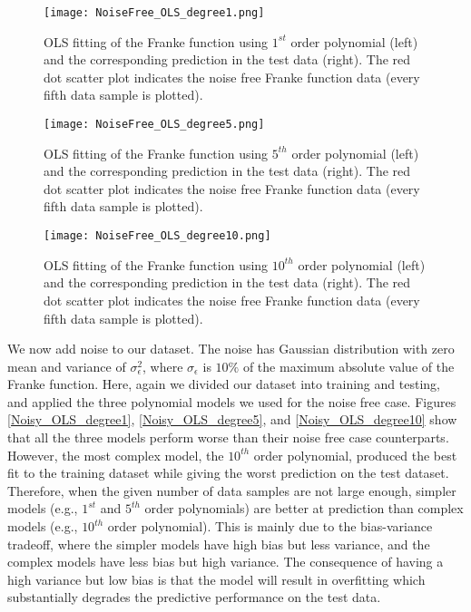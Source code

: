 \documentclass[a4paper]{article}
\begin{document}
\begin{figure}
  \centering
  \texttt{[image: NoiseFree\_OLS\_degree1.png]}
  \caption{OLS fitting of the Franke function using $1^{st}$ order polynomial (left) and the corresponding prediction in the test data (right). The red dot scatter plot indicates the noise free Franke function data (every fifth data sample is plotted).}
    \label{NoiseFree_OLS_degree1}
\end{figure}
\begin{figure}
  \centering
  \texttt{[image: NoiseFree\_OLS\_degree5.png]}
  \caption{OLS fitting of the Franke function using $5^{th}$ order polynomial (left) and the corresponding prediction in the test data (right). The red dot scatter plot indicates the noise free Franke function data (every fifth data sample is plotted).}
    \label{NoiseFree_OLS_degree5}
\end{figure}
\begin{figure}
  \centering
  \texttt{[image: NoiseFree\_OLS\_degree10.png]}
  \caption{ OLS fitting of the Franke function using $10^{th}$ order polynomial (left) and the corresponding prediction in the test data (right). The red dot scatter plot indicates the noise free Franke function data (every fifth data sample is plotted).}
    \label{NoiseFree_OLS_degree10}
\end{figure}

We now add noise to our dataset. The noise has Gaussian distribution with zero mean and variance of $\sigma_{\epsilon}^2$, where $\sigma_{\epsilon}$ is $10\%$ of the maximum absolute value of the Franke function. Here, again we divided our dataset into training and testing, and applied the three polynomial models we used for the noise free case. Figures \ref{Noisy_OLS_degree1}, \ref{Noisy_OLS_degree5}, and \ref{Noisy_OLS_degree10} show that all the three models perform worse than their noise free case counterparts. However, the most complex model, the $10^{th}$ order polynomial, produced the best fit to the training dataset while giving the worst prediction on the test dataset. Therefore, when the given number of data samples are not large enough, simpler models (e.g., $1^{st}$ and $5^{th}$ order polynomials) are better at prediction than complex
models (e.g., $10^{th}$ order polynomial). This is mainly due to the bias-variance tradeoff, where the simpler models have high bias but less variance, and the complex models have less bias but high variance. The consequence of having a high variance but low bias is that the model will result in overfitting which substantially degrades the predictive performance on the test data.
\end{document}

